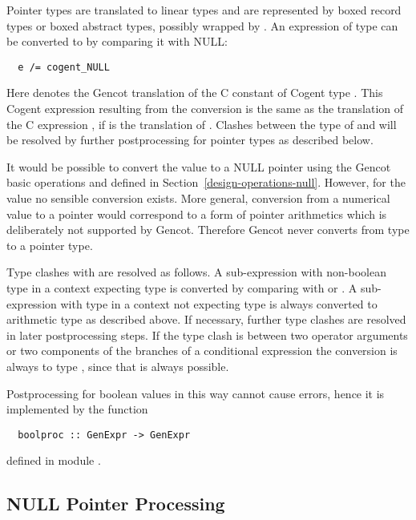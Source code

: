 Pointer types are translated to linear types and are represented by boxed record types or boxed abstract types, possibly wrapped
by . An expression  of type  can be converted to  by comparing it with NULL:
\begin{verbatim}
  e /= cogent_NULL
\end{verbatim}
Here  denotes the Gencot translation of the C constant  of Cogent type . This
Cogent expression resulting from the conversion is the same as the translation of the C expression , if
 is the translation of . Clashes between the type of  and  will be resolved
by further postprocessing for pointer types as described below.

It would be possible to convert the value  to a NULL pointer using the Gencot basic operations  and
 defined in Section~\ref{design-operations-null}. However, for the value  no sensible conversion exists.
More general, conversion from a numerical value to a pointer would correspond to a form of pointer arithmetics which is
deliberately not supported by Gencot. Therefore Gencot never converts from type  to a pointer type.

Type clashes with  are resolved as follows. A sub-expression with non-boolean type in a context expecting type 
is converted by comparing with  or . A sub-expression with type  in a context not expecting
type  is always converted to arithmetic type  as described above. If necessary, further type clashes are resolved
in later postprocessing steps. If the type clash is between two operator arguments
or two components of the branches of a conditional expression the conversion is always to type , since that is always
possible.

Postprocessing for boolean values in this way cannot cause errors, hence it is implemented by the function
\begin{verbatim}
  boolproc :: GenExpr -> GenExpr
\end{verbatim}
defined in module .

\subsection{NULL Pointer Processing}
\label{impl-post-null}

